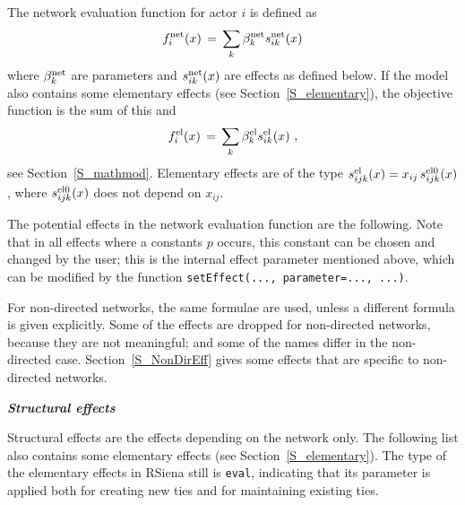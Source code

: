 \documentclass[a4paper,fleqn,11pt]{article}
\newcommand{\+}{\, + \,}
\newcommand{\RS}{{\sf \textsf{RSiena} }}
\begin{document}
The network evaluation function for actor $i$ is defined as
\begin{equation}
f^{\rm net}_i(x) \, = \,
              \sum_k \beta^{\rm net}_k s^{\rm net}_{ik}(x)   \label{f_net}
\end{equation}
where $\beta^{\rm net}_k$ are parameters and $s^{\rm net}_{ik}(x)$
are effects as defined below.
If the model also contains some elementary effects
(see Section~\ref{S_elementary}), the objective
function is the sum of this and
\begin{equation}
f^{\rm el}_i(x) \, = \,
              \sum_k \beta^{\rm el}_k s^{\rm el}_{ik}(x)  \ , \label{f_el_net}
\end{equation}
see Section~\ref{S_mathmod}.
Elementary effects are of the type $s^{\rm el}_{ijk}(x) = x_{ij}\,s^{\rm el0}_{ijk}(x)$,
where $s^{\rm el0}_{ijk}(x)$ does not depend on $x_{ij}$.


The potential effects in the \hypertarget{T_objective}{network
evaluation function}
are the following. Note that in all
effects where a constants $p$ occurs, this constant can be chosen
and changed by the user;
this is the internal effect parameter mentioned above,
which can be modified by the function \texttt{setEffect(..., parameter=..., ...)}.

For non-directed networks, the same formulae are used,
unless a different formula is given explicitly.
Some of the effects are dropped for non-directed networks, because
they are not meaningful; and some of the names differ in the
non-directed case.
Section~\ref{S_NonDirEff} gives some effects that are specific
to non-directed networks.
\medskip

\noindent
\textbf{\emph{Structural effects}}
\medskip

\noindent
Structural effects are the effects depending on the network only.
The following list also contains some elementary effects
(see Section~\ref{S_elementary}).
The type of the elementary effects in \RS still is \texttt{eval},
indicating that its parameter is applied both for creating new ties
and for maintaining existing ties.
\end{document}

